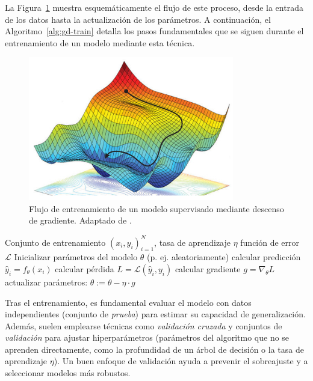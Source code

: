 \documentclass[11pt,spanish,listoffigures,listoftables]{tfgetsinf}
\begin{document}
La Figura~\ref{fig:gd_flow} muestra esquemáticamente el flujo de este proceso, desde la entrada de los datos hasta la actualización 
de los parámetros. A continuación, el Algoritmo~\ref{alg:gd-train} detalla los pasos fundamentales que se siguen durante el entrenamiento 
de un modelo mediante esta técnica.

\begin{figure}[ht]
    \centering
    \includegraphics[width=0.8\textwidth]{descenso_gradiente.png}
    \caption{Flujo de entrenamiento de un modelo supervisado mediante descenso de gradiente. Adaptado de \cite{logongasBackprop}.}
    \label{fig:gd_flow}
\end{figure}

\begin{algorithmic}
    \label{alg:gd-train}
    \REQUIRE Conjunto de entrenamiento ${(x_i, y_i)}_{i=1}^N$, tasa de aprendizaje $\eta$ función de error $\mathcal{L}$
    \STATE Inicializar parámetros del modelo $\theta$ (p. ej. aleatoriamente)
            \STATE calcular predicción $\hat{y}_i = f_\theta(x_i)$
            \STATE calcular pérdida $L = \mathcal{L}(\hat{y}_i, y_i)$ 
            \STATE calcular gradiente $g = \nabla_{\theta} L$
            \STATE actualizar parámetros: $\theta := \theta - \eta \cdot g$
        \ENDFOR
    \ENDFOR
\end{algorithmic}

Tras el entrenamiento, es fundamental evaluar el modelo con datos independientes (conjunto de \textit{prueba}) para estimar su capacidad de generalización. 
Además, suelen emplearse técnicas como \textit{validación cruzada} y conjuntos de \textit{validación} para ajustar hiperparámetros (parámetros del algoritmo 
que no se aprenden directamente, como la profundidad de un árbol de decisión o la tasa de aprendizaje $\eta$). Un buen enfoque de validación ayuda a prevenir 
el sobreajuste y a seleccionar modelos más robustos.
\end{document}
